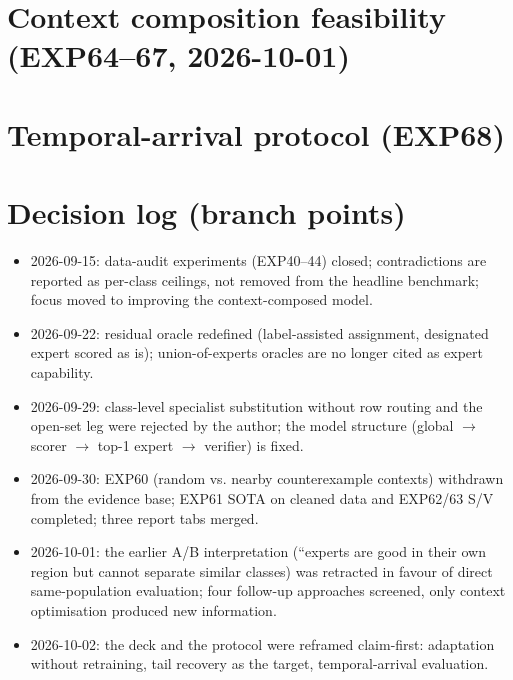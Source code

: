 \documentclass[11pt]{article}
\begin{document}
\section{Context composition feasibility (EXP64--67, 2026-10-01)}

\section{Temporal-arrival protocol (EXP68)}

\section{Decision log (branch points)}
\begin{itemize}
\item 2026-09-15: data-audit experiments (EXP40--44) closed; contradictions are reported as per-class ceilings, not removed from the headline benchmark; focus moved to improving the context-composed model.
\item 2026-09-22: residual oracle redefined (label-assisted assignment, designated expert scored as is); union-of-experts oracles are no longer cited as expert capability.
\item 2026-09-29: class-level specialist substitution without row routing and the open-set leg were rejected by the author; the model structure (global $\rightarrow$ scorer $\rightarrow$ top-1 expert $\rightarrow$ verifier) is fixed.
\item 2026-09-30: EXP60 (random vs. nearby counterexample contexts) withdrawn from the evidence base; EXP61 SOTA on cleaned data and EXP62/63 S/V completed; three report tabs merged.
\item 2026-10-01: the earlier A/B interpretation (``experts are good in their own region but cannot separate similar classes\textquotesingle\textquotesingle) was retracted in favour of direct same-population evaluation; four follow-up approaches screened, only context optimisation produced new information.
\item 2026-10-02: the deck and the protocol were reframed claim-first: adaptation without retraining, tail recovery as the target, temporal-arrival evaluation.
\end{itemize}
\end{document}
